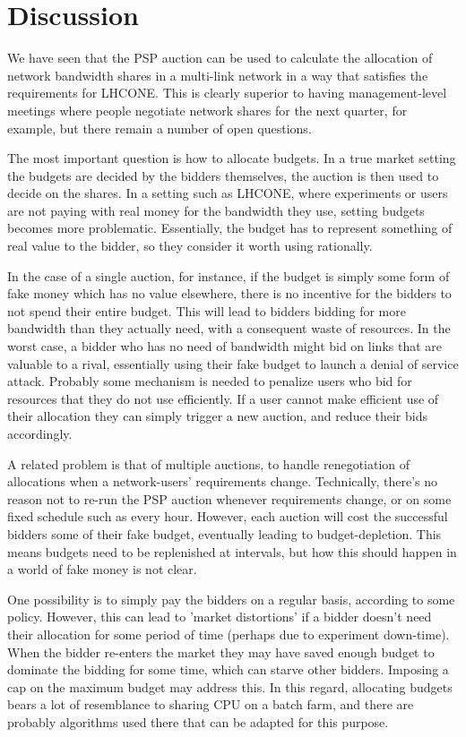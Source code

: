 \section{Discussion}

We have seen that the PSP auction can be used to calculate the allocation of network bandwidth shares in a multi-link network in a way that satisfies the requirements for LHCONE. This is clearly superior to having management-level meetings where people negotiate network shares for the next quarter, for example, but there remain a number of open questions.

The most important question is how to allocate budgets. In a true market setting the budgets are decided by the bidders themselves, the auction is then used to decide on the shares. In a setting such as LHCONE, where experiments or users are not paying with real money for the bandwidth they use, setting budgets becomes more problematic. Essentially, the budget has to represent something of real value to the bidder, so they consider it worth using rationally.

In the case of a single auction, for instance, if the budget is simply some form of fake money which has no value elsewhere, there is no incentive for the bidders to not spend their entire budget. This will lead to bidders bidding for more bandwidth than they actually need, with a consequent waste of resources. In the worst case, a bidder who has no need of bandwidth might bid on links that are valuable to a rival, essentially using their fake budget to launch a denial of service attack. Probably some mechanism is needed to penalize users who bid for resources that they do not use efficiently. If a user cannot make efficient use of their allocation they can simply trigger a new auction, and reduce their bids accordingly.

A related problem is that of multiple auctions, to handle renegotiation of allocations when a network-users' requirements change. Technically, there's no reason not to re-run the PSP auction whenever requirements change, or on some fixed schedule such as every hour. However, each auction will cost the successful bidders some of their fake budget, eventually leading to budget-depletion. This means budgets need to be replenished at intervals, but how this should happen in a world of fake money is not clear.

One possibility is to simply pay the bidders on a regular basis, according to some policy. However, this can lead to 'market distortions' if a bidder doesn't need their allocation for some period of time (perhaps due to experiment down-time). When the bidder re-enters the market they may have saved enough budget to dominate the bidding for some time, which can starve other bidders. Imposing a cap on the maximum budget may address this. In this regard, allocating budgets bears a lot of resemblance to sharing CPU on a batch farm, and there are probably algorithms used there that can be adapted for this purpose.


